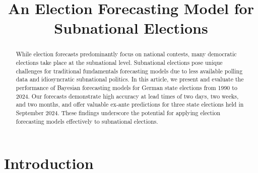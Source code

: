 \documentclass[12pt]{article}
\begin{document}
\title{An Election Forecasting Model for Subnational Elections} %


\author{} %
\maketitle


\begin{abstract}
While election forecasts predominantly focus on national contests, many democratic elections take place at the subnational level.  Subnational elections pose unique challenges for traditional fundamentals forecasting models due to less available polling data and idiosyncratic subnational politics. In this article, we present and evaluate the performance of Bayesian forecasting models for German state elections from 1990 to 2024. Our forecasts demonstrate high accuracy at lead times of two days, two weeks, and two months, and offer valuable ex-ante predictions for three state elections held in September 2024. These findings underscore the potential for applying election forecasting models effectively to subnational elections.
\end{abstract}





\section{Introduction}
\end{document}
